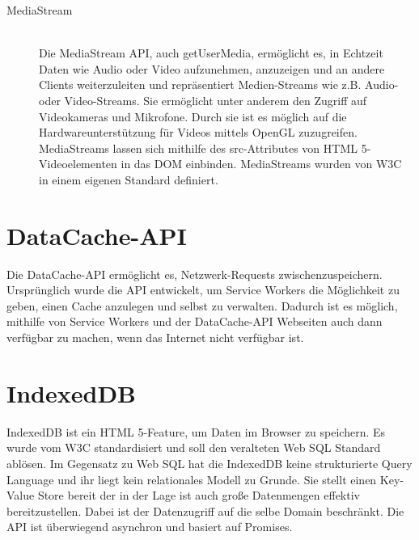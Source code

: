 \begin{description}
\item[MediaStream]\hfill \\
Die MediaStream API, auch getUserMedia, ermöglicht es, in Echtzeit Daten wie Audio oder Video aufzunehmen, anzuzeigen und an andere Clients weiterzuleiten und repräsentiert Medien-Streams wie z.B. Audio- oder Video-Streams. Sie ermöglicht unter anderem den Zugriff auf Videokameras und Mikrofone. Durch sie ist es möglich auf die Hardwareunterstützung für Videos mittels OpenGL zuzugreifen. MediaStreams lassen sich mithilfe des src-Attributes von HTML 5- Videoelementen in das DOM einbinden. MediaStreams wurden von W3C in einem eigenen Standard definiert.\cite{w3MediaStream} 

\end{description}



\section{DataCache-API}

Die DataCache-API ermöglicht es, Netzwerk-Requests zwischenzuspeichern.\cite{google-cache-api} Ursprünglich wurde die API entwickelt, um Service Workers die Möglichkeit zu geben, einen Cache anzulegen und selbst zu verwalten. Dadurch ist es möglich, mithilfe von Service Workers und der DataCache-API Webseiten auch dann verfügbar zu machen, wenn das Internet nicht verfügbar ist. 


\section{IndexedDB}

IndexedDB ist ein HTML 5-Feature, um Daten im Browser zu speichern. Es wurde vom W3C standardisiert\cite{w3IndexedDB} und soll den veralteten Web SQL Standard ablösen. Im Gegensatz zu Web SQL hat die IndexedDB keine strukturierte Query Language und ihr liegt kein relationales Modell zu Grunde. Sie stellt einen Key-Value Store bereit der in der Lage ist auch große Datenmengen effektiv bereitzustellen. Dabei ist der Datenzugriff auf die selbe Domain beschränkt. Die API ist überwiegend asynchron und basiert auf Promises.


